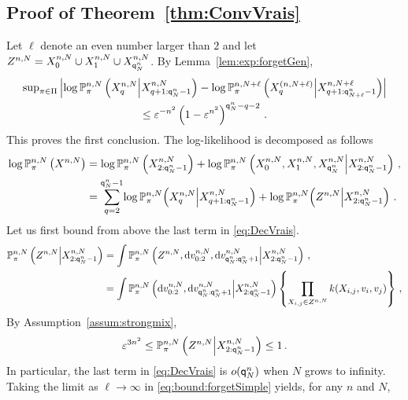 \subsection{Proof of Theorem~\ref{thm:ConvVrais}}
Let $\ell$ denote an even number larger than $2$ and let $Z^{n,N} = X_{0}^{n,N}\cup X_{1}^{n,N}\cup X_{{\mathsf{q}}^{n}_{N}}^{n,N}$. By Lemma~\ref{lem:exp:forgetGen},
\begin{multline}\label{eq:bound:forgetSimple}
\sup_{\pi\in\Pi}\left|\log \likelihood{n,N}{\pi}\left(X_{q}^{n,N}\middle|X_{q+1:\ordermax{n}{N}-1}^{n,N}\right) - \log \likelihood{n,N+\ell}{\pi}\left(X_{q}^{(n,N+\ell)}\middle|X_{q+1:\ordermax{n}{N+\ell}-1}^{n,N+\ell}\right) \right|\\
\leq \varepsilon^{-n^2}\left(1-\varepsilon^{n^2}\right)^{\ordermax{n}{N}-q-2} \eqsp.
\end{multline}
%
This proves the first conclusion. The log-likelihood is decomposed as follows
\begin{align}
\notag\log \likelihood{n,N}{\pi}\left(X^{n,N}\right) &= \log \likelihood{n,N}{\pi}\left(X_{2:\ordermax{n}{N}-1}^{n,N}\right) + \log \likelihood{n,N}{\pi}\left(X_{0}^{n,N},X_{1}^{n,N},X_{\ordermax{n}{N}}^{n,N}\middle|X_{2:\ordermax{n}{N}-1}^{n,N}\right)\eqsp,\\
\label{eq:DecVrais}&= \sum_{q=2}^{\ordermax{n}{N}-1}\!  \log \likelihood{n,N}{\pi}\!\left(X_{q}^{n,N}\middle|X_{q+1:\ordermax{n}{N}-1}^{n,N}\right) + \log \likelihood{n,N}{\pi}\!\left(Z^{n,N}\middle|X_{2:\ordermax{n}{N}-1}^{n,N}\right) \eqsp.
\end{align}
Let us first bound from above the last term in \eqref{eq:DecVrais}. 
\begin{align*}
\likelihood{n,N}{\pi}\left(Z^{n,N}\middle|X_{2:\ordermax{n}{N}-1}^{n,N}\right) &= \int \likelihood{n,N}{\pi}\left(Z^{n,N},\rmd v_{0:2}^{n,N},\rmd v_{\ordermax{n}{N}:\ordermax{n}{N}+1}^{n,N}\middle|X_{2:\ordermax{n}{N}-1}^{n,N}\right)\eqsp,\\
&= \int \likelihood{n,N}{\pi}\left(\rmd v_{0:2}^{n,N},\rmd v_{\ordermax{n}{N}:\ordermax{n}{N}+1}^{n,N}\middle|X_{2:\ordermax{n}{N}-1}^{n,N}\right)\left\{\prod_{X_{i,j}\in Z^{n,N}}\condlik(X_{i,j},v_{i},v_j)\right\}\eqsp,
\end{align*}
By Assumption~\ref{assum:strongmix},
\begin{equation}\label{Eq:BoundCoeffRestes}
\varepsilon^{3n^2}\le \likelihood{n,N}{\pi}\left(Z^{n,N}\middle|X_{2:\ordermax{n}{N}-1}^{n,N}\right)  \le 1\eqsp. 
\end{equation}
In particular, the last term in \eqref{eq:DecVrais} is $o({\mathsf{q}}^{n}_{N})$ when $N$ grows to infinity. Taking the limit as $\ell\to\infty$ in \eqref{eq:bound:forgetSimple} yields, for any $n$ and $N$,
